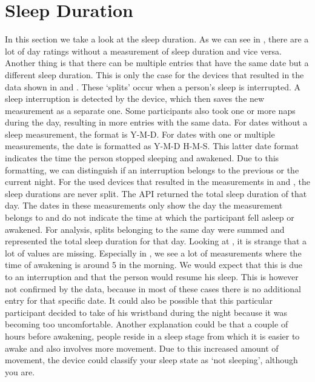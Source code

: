 
\section{Sleep Duration}
In this section we take a look at the sleep duration.
As we can see in , there are a lot of day ratings without a measurement of sleep duration and vice versa. 
Another thing is that there can be multiple entries that have the same date but a different sleep duration.
This is only the case for the devices that resulted in the data shown in  and .
These `splits' occur when a person's sleep is interrupted. 
A sleep interruption is detected by the device, which then saves the new measurement as a separate one.
Some participants also took one or more naps during the day, resulting in more entries with the same data. 
For dates without a sleep measurement, the format is Y-M-D.
For dates with one or multiple measurements, the date is formatted as Y-M-D H-M-S.
This latter date format indicates the time the person stopped sleeping and awakened.
Due to this formatting, we can distinguish if an interruption belongs to the previous or the current night.
For the used devices that resulted in the measurements in  and , the sleep durations are never split.
The API returned the total sleep duration of that day.
The dates in these measurements only show the day the measurement belongs to and do not indicate the time at which the participant fell asleep or awakened.
For analysis, splits belonging to the same day were summed and represented the total sleep duration for that day.
Looking at , it is strange that a lot of values are missing. 
Especially in , we see a lot of measurements where the time of awakening is around 5 in the morning. 
We would expect that this is due to an interruption and that the person would resume his sleep.
This is however not confirmed by the data, because in most of these cases there is no additional entry for that specific date.
It could also be possible that this particular participant decided to take of his wristband during the night because it was becoming too uncomfortable.
Another explanation could be that a couple of hours before awakening, people reside in a sleep stage from which it is easier to awake and also involves more movement.
Due to this increased amount of movement, the device could classify your sleep state as `not sleeping', although you are. 
